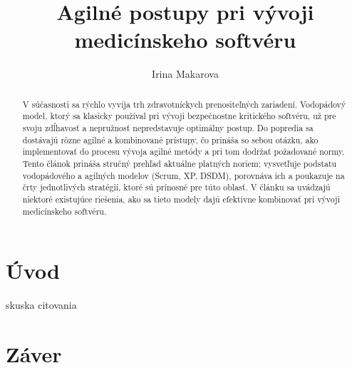 \documentclass[10pt,twoside,slovak,a4paper]{article}
\title{Agilné postupy pri vývoji medicínskeho softvéru}
\author{Irina Makarova\\[2pt]}
\date{}
\begin{document}
\renewcommand{\abstractname}{\vspace{-\baselineskip}} %
\maketitle

\begin{abstract}
V súčasnosti sa rýchlo vyvíja trh zdravotníckych prenositeľných zariadení. Vodopádový model, ktorý sa klasicky používal pri vývoji bezpečnostne kritického softvéru, už pre svoju zdĺhavosť a nepružnosť nepredstavuje optimálny postup. Do popredia sa dostávajú rôzne agilné a kombinované prístupy, čo prináša so sebou otázku, ako implementovať do procesu vývoja agilné metódy a pri tom dodržať požadované normy. Tento článok prináša stručný prehľad aktuálne platných noriem; vysvetľuje podstatu vodopádového a agilných modelov (Scrum, XP, DSDM), porovnáva ich a poukazuje na črty jednotlivých stratégií, ktoré sú prínosné pre túto oblasť. V článku sa uvádzajú niektoré existujúce riešenia, ako sa tieto modely dajú efektívne kombinovať pri vývoji medicínskeho softvéru.
\end{abstract}


\section{Úvod} \label{uvod}
skuska citovania\cite{mccaffery2019}



\section{Záver} \label{zaver} 



\end{document}
